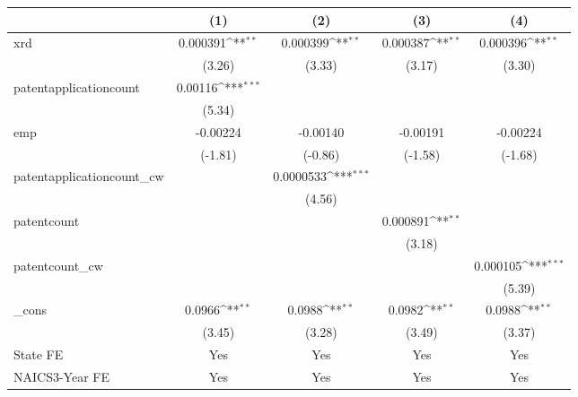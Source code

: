 {
\def\sym#1{\ifmmode^{#1}\else\(^{#1}\)\fi}
\begin{tabular}{l*{4}{c}}
\hline\hline
            &\multicolumn{1}{c}{(1)}         &\multicolumn{1}{c}{(2)}         &\multicolumn{1}{c}{(3)}         &\multicolumn{1}{c}{(4)}         \\
\hline
xrd         &    0.000391\sym{**} &    0.000399\sym{**} &    0.000387\sym{**} &    0.000396\sym{**} \\
            &      (3.26)         &      (3.33)         &      (3.17)         &      (3.30)         \\
[1em]
patentapplicationcount&     0.00116\sym{***}&                     &                     &                     \\
            &      (5.34)         &                     &                     &                     \\
[1em]
emp         &    -0.00224         &    -0.00140         &    -0.00191         &    -0.00224         \\
            &     (-1.81)         &     (-0.86)         &     (-1.58)         &     (-1.68)         \\
[1em]
patentapplicationcount\_cw&                     &   0.0000533\sym{***}&                     &                     \\
            &                     &      (4.56)         &                     &                     \\
[1em]
patentcount &                     &                     &    0.000891\sym{**} &                     \\
            &                     &                     &      (3.18)         &                     \\
[1em]
patentcount\_cw&                     &                     &                     &    0.000105\sym{***}\\
            &                     &                     &                     &      (5.39)         \\
[1em]
\_cons      &      0.0966\sym{**} &      0.0988\sym{**} &      0.0982\sym{**} &      0.0988\sym{**} \\
            &      (3.45)         &      (3.28)         &      (3.49)         &      (3.37)         \\
[1em]
State FE    &         Yes         &         Yes         &         Yes         &         Yes         \\
[1em]
NAICS3-Year FE&         Yes         &         Yes         &         Yes         &         Yes         \\

\end{tabular}}
